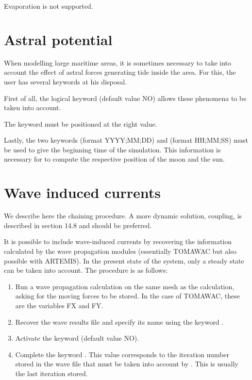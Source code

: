 Evaporation is not supported.


\section{Astral potential}
\label{sec:astral:pot}
 When modelling large maritime areas, it is sometimes necessary to take into account the effect of astral forces generating tide inside the area. For this, the user has several keywords at his disposal.

 First of all, the logical keyword  (default value NO) allows these phenomena to be taken into account.

 The keyword   must be positioned at the right value.

 Lastly, the two keywords  (format YYYY;MM;DD) and   (format HH;MM;SS) must be used to give the beginning time of the simulation. This information is necessary for  to compute the respective position of the moon and the sun.


\section{Wave induced currents}

 We describe here the chaining procedure.  A more dynamic solution, coupling, is described in section 14.8 and should be preferred.

 It is possible to include wave-induced currents by recovering the information calculated by the wave propagation modules (essentially TOMAWAC but also possible with ARTEMIS). In the present state of the system, only a steady state can be taken into account. The procedure is as follows:

\begin{enumerate}
\item  Run a wave propagation calculation on the same mesh as the  calculation, asking for the moving forces to be stored. In the case of TOMAWAC, these are the variables FX and FY.

\item  Recover the wave results file and specify its name using the keyword .

\item  Activate the keyword  (default value NO).

\item  Complete the keyword . This value corresponds to the iteration number stored in the wave file that must be taken into account by . This is usually the last iteration stored.
\end{enumerate}

